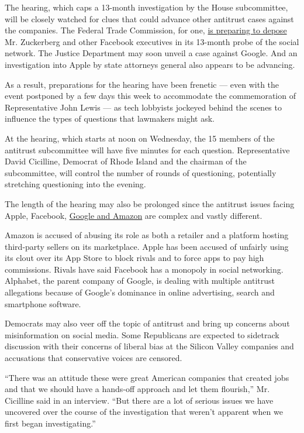 The hearing, which caps a 13-month investigation by the House
subcommittee, will be closely watched for clues that could advance other
antitrust cases against the companies. The Federal Trade Commission, for
one,
\href{https://www.nytimes.com/2020/07/17/technology/ftc-facebook-investigation.html}{is
preparing to depose} Mr. Zuckerberg and other Facebook executives in its
13-month probe of the social network. The Justice Department may soon
unveil a case against Google. And an investigation into Apple by state
attorneys general also appears to be advancing.

As a result, preparations for the hearing have been frenetic --- even
with the event postponed by a few days this week to accommodate the
commemoration of Representative John Lewis --- as tech lobbyists
jockeyed behind the scenes to influence the types of questions that
lawmakers might ask.

At the hearing, which starts at noon on Wednesday, the 15 members of the
antitrust subcommittee will have five minutes for each question.
Representative David Cicilline, Democrat of Rhode Island and the
chairman of the subcommittee, will control the number of rounds of
questioning, potentially stretching questioning into the evening.

The length of the hearing may also be prolonged since the antitrust
issues facing Apple, Facebook,
\href{https://www.nytimes.com/2019/06/02/business/google-antitrust-investigation.html}{Google
and Amazon} are complex and vastly different.

Amazon is accused of abusing its role as both a retailer and a platform
hosting third-party sellers on its marketplace. Apple has been accused
of unfairly using its clout over its App Store to block rivals and to
force apps to pay high commissions. Rivals have said Facebook has a
monopoly in social networking. Alphabet, the parent company of Google,
is dealing with multiple antitrust allegations because of Google's
dominance in online advertising, search and smartphone software.

Democrats may also veer off the topic of antitrust and bring up concerns
about misinformation on social media. Some Republicans are expected to
sidetrack discussion with their concerns of liberal bias at the Silicon
Valley companies and accusations that conservative voices are censored.

``There was an attitude these were great American companies that created
jobs and that we should have a hands-off approach and let them
flourish,'' Mr. Cicilline said in an interview. ``But there are a lot of
serious issues we have uncovered over the course of the investigation
that weren't apparent when we first began investigating.''

